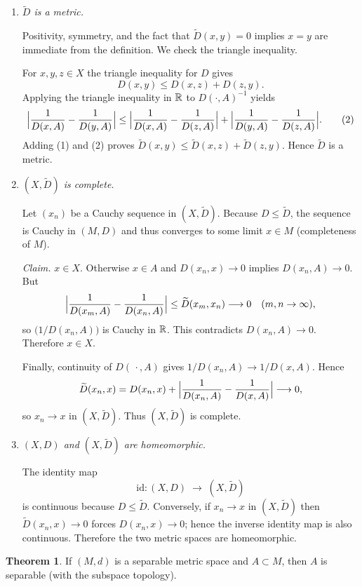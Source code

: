 \documentclass[12pt]{article}
\theoremstyle{definition} %
\newtheorem{theorem}{Theorem}
\theoremstyle{plain} %
\begin{document}
\begin{enumerate}[label=(\alph*)]

\item \emph{\(\widetilde D\) is a metric.}

Positivity, symmetry, and the fact that \(\widetilde D(x,y)=0\)
implies \(x=y\) are immediate from the definition.
We check the triangle inequality.

For \(x,y,z\in X\) the triangle inequality for \(D\) gives
\[
   D(x,y)\le D(x,z)+D(z,y). \tag{1}
\]
Applying the triangle inequality in \(\Bbb R\) to
\(D(\cdot,A)^{-1}\) yields
\[
   \Bigl|
     \frac1{D(x,A)}-\frac1{D(y,A)}
   \Bigr|
   \le
   \Bigl|
     \frac1{D(x,A)}-\frac1{D(z,A)}
   \Bigr|
   +
   \Bigl|
     \frac1{D(y,A)}-\frac1{D(z,A)}
   \Bigr|. \tag{2}
\]
Adding (1) and (2) proves
\(
   \widetilde D(x,y)\le \widetilde D(x,z)+\widetilde D(z,y).
\)
Hence \(\widetilde D\) is a metric.

\item \emph{\((X,\widetilde D)\) is complete.}

Let \((x_n)\) be a Cauchy sequence in \((X,\widetilde D)\).
Because \(D\le\widetilde D\), the sequence is Cauchy in \((M,D)\) and
thus converges to some limit \(x\in M\) (completeness of \(M\)).

\smallskip
\textit{Claim.} \(x\in X\).
Otherwise \(x\in A\) and \(D(x_n,x)\to0\) implies \(D(x_n,A)\to0\).
But
\[
   \Bigl|
     \frac1{D(x_m,A)}-\frac1{D(x_n,A)}
   \Bigr|
   \le \widetilde D(x_m,x_n)\longrightarrow 0
   \quad(m,n\to\infty),
\]
so \(\bigl(1/D(x_n,A)\bigr)\) is Cauchy in \(\Bbb R\).
This contradicts \(D(x_n,A)\to0\).
Therefore \(x\in X\).

\smallskip
Finally, continuity of \(D(\,\cdot\!,A)\) gives
\(1/D(x_n,A)\to 1/D(x,A)\).
Hence
\[
   \widetilde D(x_n,x)
      =D(x_n,x)+
       \Bigl|
         \frac1{D(x_n,A)}-\frac1{D(x,A)}
       \Bigr|
      \longrightarrow 0,
\]
so \(x_n\to x\) in \((X,\widetilde D)\).
Thus \((X,\widetilde D)\) is complete.

\item \emph{\((X,D)\) and \((X,\widetilde D)\) are homeomorphic.}

The identity map
\[
   \mathrm{id}:(X,D)\;\longrightarrow\;(X,\widetilde D)
\]
is continuous because \(D\le\widetilde D\).
Conversely, if \(x_n\to x\) in \((X,\widetilde D)\) then
\(\widetilde D(x_n,x)\to0\) forces \(D(x_n,x)\to0\);
hence the inverse identity map is also continuous.
Therefore the two metric spaces are homeomorphic.

\end{enumerate}
\begin{theorem}
  If \((M,d)\) is a separable metric space and \(A\subset M\), then
  \(A\) is separable (with the subspace topology).
  \end{theorem}
  
\end{document}
